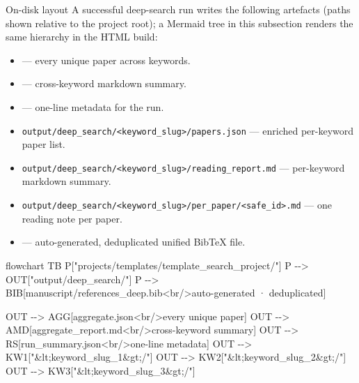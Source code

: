 \documentclass[
  ignorenonframetext,
]{beamer}
\newenvironment{Shaded}{}{}
\newcommand{\NormalTok}[1]{#1}
\providecommand{\tightlist}{%
  \setlength{\itemsep}{0pt}\setlength{\parskip}{0pt}}
\begin{document}
\begin{frame}{On-disk layout}
\protect{}\label{on-disk-layout}
A successful deep-search run writes the following artefacts (paths shown
relative to the project root); a Mermaid tree in this subsection renders
the same hierarchy in the HTML build:

\begin{itemize}
\tightlist
\item
   --- every unique paper
  across keywords.
\item
   --- cross-keyword
  markdown summary.
\item
   --- one-line metadata
  for the run.
\item
  \texttt{output/deep\_search/\textless{}keyword\_slug\textgreater{}/papers.json}
  --- enriched per-keyword paper list.
\item
  \texttt{output/deep\_search/\textless{}keyword\_slug\textgreater{}/reading\_report.md}
  --- per-keyword markdown summary.
\item
  \texttt{output/deep\_search/\textless{}keyword\_slug\textgreater{}/per\_paper/\textless{}safe\_id\textgreater{}.md}
  --- one reading note per paper.
\item
   --- auto-generated,
  deduplicated unified BibTeX file.
\end{itemize}

\begin{Shaded}
\begin{Highlighting}[]
\NormalTok{flowchart TB}
\NormalTok{    P["projects/templates/template\_search\_project/"]}
\NormalTok{    P {-}{-}\textgreater{} OUT["output/deep\_search/"]}
\NormalTok{    P {-}{-}\textgreater{} BIB[manuscript/references\_deep.bib\textless{}br/\textgreater{}auto{-}generated · deduplicated]}

\NormalTok{    OUT {-}{-}\textgreater{} AGG[aggregate.json\textless{}br/\textgreater{}every unique paper]}
\NormalTok{    OUT {-}{-}\textgreater{} AMD[aggregate\_report.md\textless{}br/\textgreater{}cross{-}keyword summary]}
\NormalTok{    OUT {-}{-}\textgreater{} RS[run\_summary.json\textless{}br/\textgreater{}one{-}line metadata]}
\NormalTok{    OUT {-}{-}\textgreater{} KW1["\&lt;keyword\_slug\_1\&gt;/"]}
\NormalTok{    OUT {-}{-}\textgreater{} KW2["\&lt;keyword\_slug\_2\&gt;/"]}
\NormalTok{    OUT {-}{-}\textgreater{} KW3["\&lt;keyword\_slug\_3\&gt;/"]}


\end{Highlighting}
\end{Shaded}
\end{frame}
\end{document}
